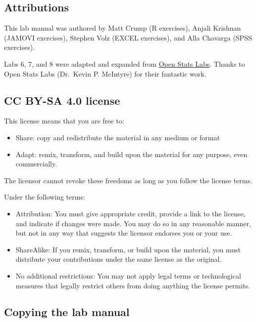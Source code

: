 \documentclass[]{book}
\providecommand{\tightlist}{%
  \setlength{\itemsep}{0pt}\setlength{\parskip}{0pt}}
\begin{document}
\subsection{Attributions}\label{attributions}

This lab manual was authored by Matt Crump (R exercises), Anjali
Krishnan (JAMOVI exercises), Stephen Volz (EXCEL exercises), and Alla
Chavarga (SPSS exercises).

Labs 6, 7, and 8 were adapted and expanded from
\href{https://sites.trinity.edu/osl}{Open Stats Labs}. Thanks to Open
Stats Labs (Dr.~Kevin P. McIntyre) for their fantastic work.

\subsection{CC BY-SA 4.0 license}\label{cc-by-sa-4.0-license}

This license means that you are free to:

\begin{itemize}
\tightlist
\item
  Share: copy and redistribute the material in any medium or format
\item
  Adapt: remix, transform, and build upon the material for any purpose,
  even commercially.
\end{itemize}

The licensor cannot revoke these freedoms as long as you follow the
license terms.

Under the following terms:

\begin{itemize}
\tightlist
\item
  Attribution: You must give appropriate credit, provide a link to the
  license, and indicate if changes were made. You may do so in any
  reasonable manner, but not in any way that suggests the licensor
  endorses you or your use.
\item
  ShareAlike: If you remix, transform, or build upon the material, you
  must distribute your contributions under the same license as the
  original.
\item
  No additional restrictions: You may not apply legal terms or
  technological measures that legally restrict others from doing
  anything the license permits.
\end{itemize}

\subsection{Copying the lab manual}\label{copying-the-lab-manual}
\end{document}
